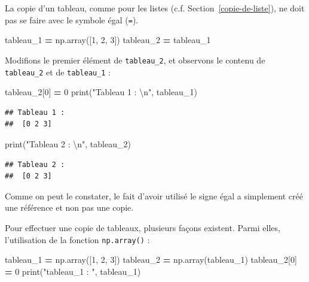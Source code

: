 \documentclass[12pt,]{book}
\newenvironment{Shaded}{\begin{snugshade}}{\end{snugshade}}
\newcommand{\DecValTok}[1]{\textcolor[rgb]{0.00,0.00,0.81}{#1}}
\newcommand{\CharTok}[1]{\textcolor[rgb]{0.31,0.60,0.02}{#1}}
\newcommand{\StringTok}[1]{\textcolor[rgb]{0.31,0.60,0.02}{#1}}
\newcommand{\OperatorTok}[1]{\textcolor[rgb]{0.81,0.36,0.00}{\textbf{#1}}}
\newcommand{\BuiltInTok}[1]{#1}
\newcommand{\NormalTok}[1]{#1}
\numberwithin{equation}{section}
\numberwithin{countremarque}{section}
\begin{document}
La copie d'un tableau, comme pour les listes (c.f.
Section~\ref{copie-de-liste}), ne doit pas se faire avec le symbole égal
(\texttt{=}).

\begin{Shaded}
\begin{Highlighting}[]
\NormalTok{tableau_1 }\OperatorTok{=}\NormalTok{ np.array([}\DecValTok{1}\NormalTok{, }\DecValTok{2}\NormalTok{, }\DecValTok{3}\NormalTok{])}
\NormalTok{tableau_2 }\OperatorTok{=}\NormalTok{ tableau_1}
\end{Highlighting}
\end{Shaded}

Modifions le premier élément de \texttt{tableau\_2}, et observons le
contenu de \texttt{tableau\_2} et de \texttt{tableau\_1} :

\begin{Shaded}
\begin{Highlighting}[]
\NormalTok{tableau_2[}\DecValTok{0}\NormalTok{] }\OperatorTok{=} \DecValTok{0}
\BuiltInTok{print}\NormalTok{(}\StringTok{"Tableau 1 : }\CharTok{\textbackslash{}n}\StringTok{"}\NormalTok{, tableau_1)}
\end{Highlighting}
\end{Shaded}

\begin{lstlisting}
## Tableau 1 : 
##  [0 2 3]
\end{lstlisting}

\begin{Shaded}
\begin{Highlighting}[]
\BuiltInTok{print}\NormalTok{(}\StringTok{"Tableau 2 : }\CharTok{\textbackslash{}n}\StringTok{"}\NormalTok{, tableau_2)}
\end{Highlighting}
\end{Shaded}

\begin{lstlisting}
## Tableau 2 : 
##  [0 2 3]
\end{lstlisting}

Comme on peut le constater, le fait d'avoir utilisé le signe égal a
simplement créé une référence et non pas une copie.

Pour effectuer une copie de tableaux, plusieurs façons existent. Parmi
elles, l'utilisation de la fonction \texttt{np.array()} :

\begin{Shaded}
\begin{Highlighting}[]
\NormalTok{tableau_1 }\OperatorTok{=}\NormalTok{ np.array([}\DecValTok{1}\NormalTok{, }\DecValTok{2}\NormalTok{, }\DecValTok{3}\NormalTok{])}
\NormalTok{tableau_2 }\OperatorTok{=}\NormalTok{ np.array(tableau_1)}
\NormalTok{tableau_2[}\DecValTok{0}\NormalTok{] }\OperatorTok{=} \DecValTok{0}
\BuiltInTok{print}\NormalTok{(}\StringTok{"tableau_1 : "}\NormalTok{, tableau_1)}
\end{Highlighting}
\end{Shaded}
\end{document}
